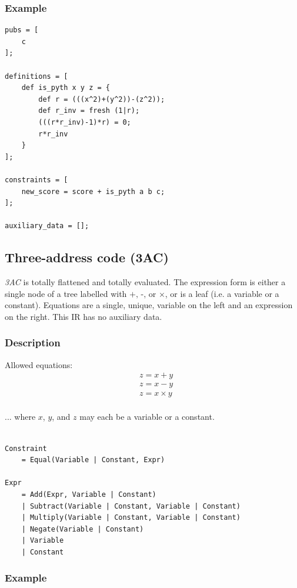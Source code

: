 \documentclass[
    9pt,            %
    techreport,        %
    affiltop,       %
]{art}
\begin{document}
\subsubsection{Example}

\begin{verbatim}
pubs = [
    c
];

definitions = [
    def is_pyth x y z = {
        def r = (((x^2)+(y^2))-(z^2));
        def r_inv = fresh (1|r);
        (((r*r_inv)-1)*r) = 0;
        r*r_inv
    }
];

constraints = [
    new_score = score + is_pyth a b c;
];

auxiliary_data = [];
\end{verbatim}

\subsection{Three-address code (3AC)}

\emph{3AC} is totally flattened and totally evaluated. The expression form is either a single node of a tree labelled with $\text{+, -,}$ or $\times$, or is a leaf (i.e. a variable or a constant). Equations are a single, unique, variable on the left and an expression on the right. This IR has no auxiliary data. 

\subsubsection{Description}
Allowed equations:
\begin{align*}
  & z = x + y\\
  & z = x - y\\
  & z = x\times y\\
\end{align*}
  
  ... where $x$, $y$, and $z$ may each be a variable or a constant.

\begin{verbatim}

Constraint
    = Equal(Variable | Constant, Expr)

Expr 
    = Add(Expr, Variable | Constant) 
    | Subtract(Variable | Constant, Variable | Constant)
    | Multiply(Variable | Constant, Variable | Constant)
    | Negate(Variable | Constant)
    | Variable
    | Constant
\end{verbatim}

\subsubsection{Example}
\end{document}

